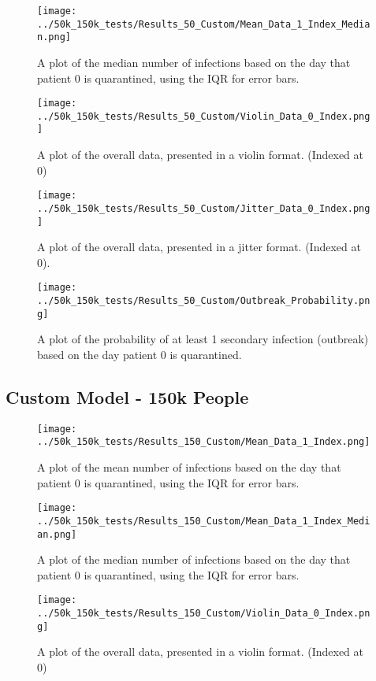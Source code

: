 \documentclass{article}
\numberwithin{equation}{section} %
\begin{document}
\begin{figure}[H]
  \centering
  \texttt{[image: ../50k\_150k\_tests/Results\_50\_Custom/Mean\_Data\_1\_Index\_Median.png]}
  \caption{A plot of the median number of infections based on the day that patient 0 is quarantined, using the IQR for error bars.}
\end{figure}

\begin{figure}[H]
  \centering
  \texttt{[image: ../50k\_150k\_tests/Results\_50\_Custom/Violin\_Data\_0\_Index.png]}
  \caption{A plot of the overall data, presented in a violin format. (Indexed at 0)}
\end{figure}

\begin{figure}[H]
  \centering
  \texttt{[image: ../50k\_150k\_tests/Results\_50\_Custom/Jitter\_Data\_0\_Index.png]}
  \caption{A plot of the overall data, presented in a jitter format. (Indexed at 0).}
\end{figure}

\begin{figure}[H]
  \centering
  \texttt{[image: ../50k\_150k\_tests/Results\_50\_Custom/Outbreak\_Probability.png]}
  \caption{A plot of the probability of at least 1 secondary infection (outbreak) based on the day patient 0 is quarantined.}
\end{figure}

\subsection{Custom Model - 150k People}
\begin{figure}[H]
  \centering
  \texttt{[image: ../50k\_150k\_tests/Results\_150\_Custom/Mean\_Data\_1\_Index.png]}
  \caption{A plot of the mean number of infections based on the day that patient 0 is quarantined, using the IQR for error bars.}
\end{figure}

\begin{figure}[H]
  \centering
  \texttt{[image: ../50k\_150k\_tests/Results\_150\_Custom/Mean\_Data\_1\_Index\_Median.png]}
  \caption{A plot of the median number of infections based on the day that patient 0 is quarantined, using the IQR for error bars.}
\end{figure}

\begin{figure}[H]
  \centering
  \texttt{[image: ../50k\_150k\_tests/Results\_150\_Custom/Violin\_Data\_0\_Index.png]}
  \caption{A plot of the overall data, presented in a violin format. (Indexed at 0)}
\end{figure}
\end{document}
